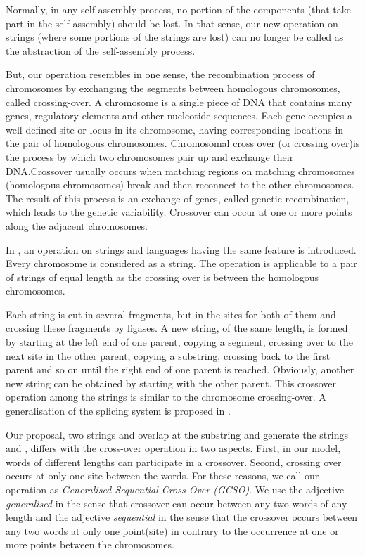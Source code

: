 \documentclass{llncs}
\begin{document}
Normally, in any self-assembly process, no portion of the components
(that take part in the self-assembly) should be lost.  In that
sense, our new operation on strings (where some portions of the
strings are lost) can no longer be called as the abstraction of the
self-assembly process.
\par
But, our operation resembles in one sense, the recombination process
of chromosomes by exchanging the segments between homologous
chromosomes, called crossing-over. A chromosome is a single piece of
DNA that contains many genes, regulatory elements and other
nucleotide sequences.  Each gene occupies a well-defined site or
locus in its chromosome, having corresponding locations in the pair
of homologous chromosomes.  Chromosomal cross over (or crossing
over)is the process by which two chromosomes pair up and exchange
their DNA.Crossover usually occurs when matching regions on matching
chromosomes (homologous chromosomes) break and then reconnect to the
other chromosomes.  The result of this process is an exchange of
genes, called genetic recombination, which leads to the genetic
variability.  Crossover can occur at one or more points along the
adjacent chromosomes.
\par
In \cite{mitrana1}, an operation on strings and languages having the
same feature is introduced.  Every chromosome is considered as a
string.  The operation is applicable to a pair of strings of equal
length as the crossing over is between the homologous chromosomes.
\par
Each string is cut in several fragments, but in the sites for both
of them and crossing these fragments by ligases.  A new string, of
the same length, is formed by starting at the left end of one
parent, copying a segment, crossing over to the next site in the
other parent, copying a substring, crossing back to the first parent
and so on until the right end of one parent is reached.  Obviously,
another new string can be obtained by starting with the other
parent.  This crossover operation \cite{mitrana1} among the strings
is similar to the chromosome crossing-over.  A generalisation of the
splicing system is proposed in \cite{mitrana2}.
\par
Our proposal, two strings 
  and  overlap at  the substring 
    and generate the strings  and , differs with
    the cross-over operation in two aspects. First, in our model,
    words of different lengths can participate in a crossover.
    Second, crossing over occurs at only one site between the words.
     For these reasons, we call our operation as
     {\em Generalised Sequential Cross Over (GCSO)}.  We use the
     adjective {\it generalised} in the sense that crossover can
     occur between any two words of any length and the adjective
     {\it sequential} in the sense that the crossover occurs between
     any two words at only one point(site) in contrary to the
     occurrence at one or more points between the chromosomes.
\end{document}

